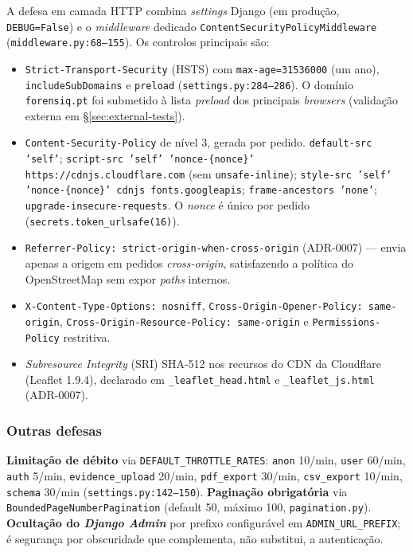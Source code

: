 A defesa em camada HTTP combina \emph{settings} Django (em
produção, \texttt{DEBUG=False}) e o \emph{middleware} dedicado
\texttt{ContentSecurityPolicyMiddleware}
(\texttt{middleware.py:68--155}). Os controlos principais são:

\begin{itemize}[leftmargin=2em]
    \item \texttt{Strict-Transport-Security} (HSTS) com
          \texttt{max-age=31536000} (um ano), \texttt{includeSubDomains}
          e \texttt{preload} (\texttt{settings.py:284--286}). O domínio
          \texttt{forensiq.pt} foi submetido à lista \emph{preload} dos
          principais \emph{browsers} (validação externa em
          \S\ref{sec:external-tests}).
    \item \texttt{Content-Security-Policy} de nível 3, gerada por
          pedido. \texttt{default-src 'self'};
          \texttt{script-src 'self' 'nonce-\{nonce\}' https://cdnjs.cloudflare.com}
          (sem \texttt{unsafe-inline});
          \texttt{style-src 'self' 'nonce-\{nonce\}' cdnjs fonts.googleapis};
          \texttt{frame-ancestors 'none'};
          \texttt{upgrade-insecure-requests}. O \emph{nonce} é único
          por pedido (\texttt{secrets.token\_urlsafe(16)}).
    \item \texttt{Referrer-Policy: strict-origin-when-cross-origin}
          (ADR-0007) --- envia apenas a origem em pedidos
          \emph{cross-origin}, satisfazendo a política do
          OpenStreetMap sem expor \emph{paths} internos.
    \item \texttt{X-Content-Type-Options: nosniff},
          \texttt{Cross-Origin-Opener-Policy: same-origin},
          \texttt{Cross-Origin-Resource-Policy: same-origin} e
          \texttt{Permissions-Policy} restritiva.
    \item \emph{Subresource Integrity} (SRI) SHA-512 nos recursos
          do CDN da Cloudflare (Leaflet 1.9.4), declarado em
          \texttt{\_leaflet\_head.html} e \texttt{\_leaflet\_js.html}
          (ADR-0007).
\end{itemize}

\subsubsection{Outras defesas}
\label{sec:other-defenses}

\textbf{Limitação de débito} via \texttt{DEFAULT\_THROTTLE\_RATES}:
\texttt{anon} 10/min, \texttt{user} 60/min, \texttt{auth} 5/min,
\texttt{evidence\_upload} 20/min, \texttt{pdf\_export} 30/min,
\texttt{csv\_export} 10/min, \texttt{schema} 30/min
(\texttt{settings.py:142--150}). \textbf{Paginação obrigatória} via
\texttt{BoundedPageNumberPagination} (default 50, máximo 100,
\texttt{pagination.py}). \textbf{Ocultação do \emph{Django Admin}}
por prefixo configurável em \texttt{ADMIN\_URL\_PREFIX}; é segurança
por obscuridade que complementa, não substitui, a autenticação.

